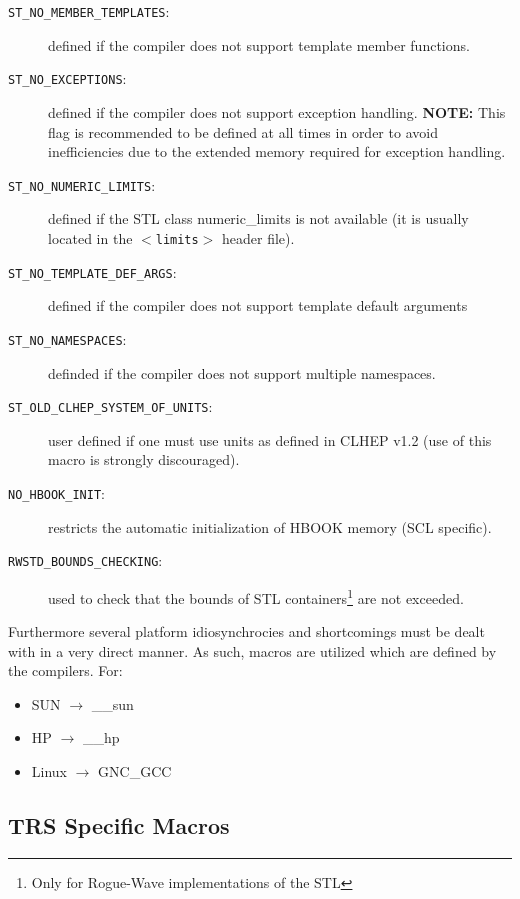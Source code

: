 \documentclass[twoside]{article}
\newcommand{\name}[1]{\textsf{#1}}%
\newcommand{\comp}[1]{\texttt{#1}}%
\begin{document}
\begin{description}
\item[\comp{ST\_NO\_MEMBER\_TEMPLATES}:] defined if the compiler does not support template
    member functions. 
\item[\comp{ST\_NO\_EXCEPTIONS}:] defined  if the compiler does not support exception
    handling. {\bf NOTE:} This flag is recommended to be defined at all times in order to
avoid inefficiencies due to the extended memory required for exception 
handling. 
\item[\comp{ST\_NO\_NUMERIC\_LIMITS}:] defined if the STL class \name{numeric\_limits}
    is not available (it is usually located in the $<$\comp{limits}$>$ header file).
\item[\comp{ST\_NO\_TEMPLATE\_DEF\_ARGS}:] defined if the compiler does not support
    template default arguments
\item[\comp{ST\_NO\_NAMESPACES}:] definded if the compiler does not support
  multiple namespaces.
\item[\comp{ST\_OLD\_CLHEP\_SYSTEM\_OF\_UNITS}:] user defined if one must use units as
  defined in CLHEP v1.2 (use of this macro is strongly discouraged).
\item[\comp{NO\_HBOOK\_INIT}:] restricts the automatic initialization of HBOOK
  memory (SCL specific).
\item[\comp{RWSTD\_BOUNDS\_CHECKING}:] used to check that the bounds of 
STL  containers\footnote{Only for Rogue-Wave  
        implementations of the STL}
      are not exceeded.
\end{description}

Furthermore several platform idiosynchrocies and shortcomings must
be dealt with in a very direct manner.  As such, macros are utilized
which are defined by the compilers. For:
\begin{itemize}
  \item SUN $\rightarrow$ \_\_sun
  \item HP  $\rightarrow$ \_\_hp
  \item Linux $\rightarrow$ GNC\_GCC
\end{itemize}

\subsection{\name{TRS} Specific Macros}
\end{document}
